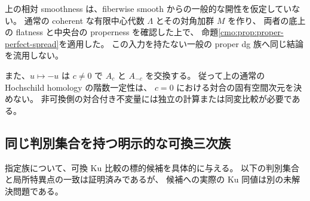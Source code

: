 \begin{remark}[相対化と対合付き比較の区別]
上の相対 smoothness は、fiberwise smooth からの一般的な開性を仮定していない。
通常の coherent な有限中心代数 $\Lambda$ とその対角加群 $M$ を作り、
両者の底上の flatness と中央台の properness を確認した上で、
命題\ref{cmo:prop:proper-perfect-spread}を適用した。
この入力を持たない一般の proper dg 族へ同じ結論を流用しない。

また、$u\mapsto-u$ は $c\ne0$ で $A_c$ と $A_{-c}$ を交換する。
従って上の通常の Hochschild homology の階数一定性は、
$c=0$ における対合の固有空間次元を決めない。
非可換側の対合付き不変量には独立の計算または同変比較が必要である。
\end{remark}

\subsection{同じ判別集合を持つ明示的な可換三次族}

指定族について、可換 Ku 比較の標的候補を具体的に与える。
以下の判別集合と局所特異点の一致は証明済みであるが、
候補への実際の Ku 同値は別の未解決問題である。

